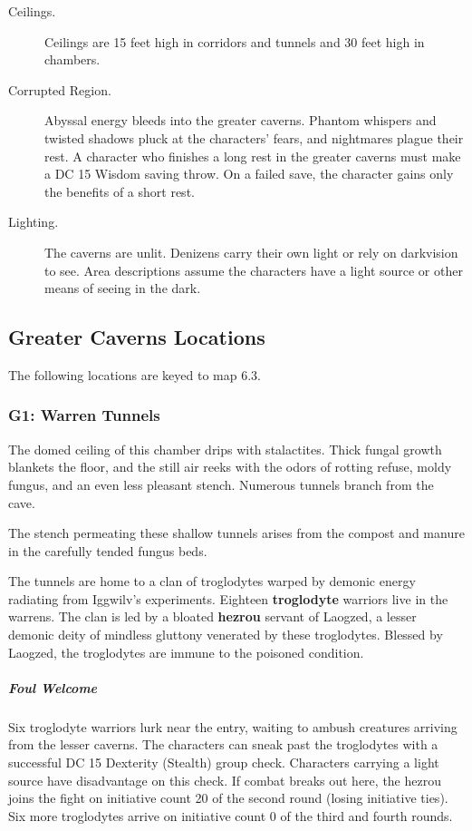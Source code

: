 \documentclass[10pt,a4paper,twoside,bg=print,twocolumn,openany,nodeprecatedcode]{dndbook}
\begin{document}
\begin{description}
\item[Ceilings.]
Ceilings are 15 feet high in corridors and tunnels and 30 feet high in chambers.
\item[Corrupted Region.]
Abyssal energy bleeds into the greater caverns. Phantom whispers and twisted shadows pluck at the characters' fears, and nightmares plague their rest. A character who finishes a long rest in the greater caverns must make a DC 15 Wisdom saving throw. On a failed save, the character gains only the benefits of a short rest.
\item[Lighting.]
The caverns are unlit. Denizens carry their own light or rely on darkvision to see. Area descriptions assume the characters have a light source or other means of seeing in the dark.
\end{description}

\subsection{Greater Caverns Locations}
The following locations are keyed to map 6.3.

\subsubsection{G1: Warren Tunnels}
\begin{DndReadAloud}{}
The domed ceiling of this chamber drips with stalactites. Thick fungal growth blankets the floor, and the still air reeks with the odors of rotting refuse, moldy fungus, and an even less pleasant stench. Numerous tunnels branch from the cave.

\end{DndReadAloud}

The stench permeating these shallow tunnels arises from the compost and manure in the carefully tended fungus beds.

The tunnels are home to a clan of troglodytes warped by demonic energy radiating from Iggwilv's experiments. Eighteen \textbf{troglodyte} warriors live in the warrens. The clan is led by a bloated \textbf{hezrou} servant of Laogzed, a lesser demonic deity of mindless gluttony venerated by these troglodytes. Blessed by Laogzed, the troglodytes are immune to the poisoned condition.

\subparagraph{Foul Welcome}
Six troglodyte warriors lurk near the entry, waiting to ambush creatures arriving from the lesser caverns. The characters can sneak past the troglodytes with a successful DC 15 Dexterity (Stealth) group check. Characters carrying a light source have disadvantage on this check. If combat breaks out here, the hezrou joins the fight on initiative count 20 of the second round (losing initiative ties). Six more troglodytes arrive on initiative count 0 of the third and fourth rounds.
\end{document}
